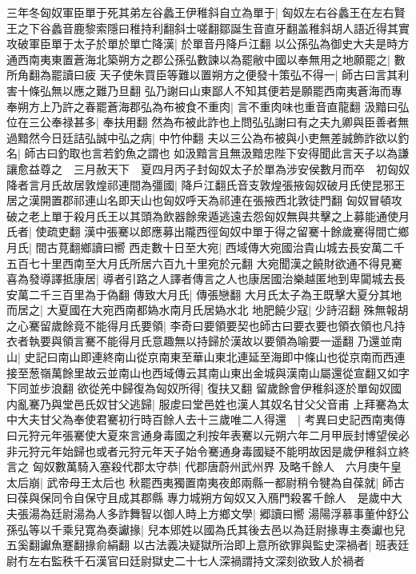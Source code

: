 三年冬匈奴軍臣單于死其弟左谷蠡王伊稚斜自立為單于|{
	匈奴左右谷蠡王在左右賢王之下谷蠡音鹿黎索隱曰稚持利翻斜士嗟翻鄒誕生音直牙翻盖稚斜胡人語近得其實}
攻破軍臣單于太子於單於單亡降漢|{
	於單音丹降戶江翻}
以公孫弘為御史大夫是時方通西南夷東置蒼海北築朔方之郡公孫弘數諫以為罷敝中國以奉無用之地願罷之|{
	數所角翻為罷讀曰疲}
天子使朱買臣等難以置朔方之便發十策弘不得一|{
	師古曰言其利害十條弘無以應之難乃旦翻}
弘乃謝曰山東鄙人不知其便若是願罷西南夷蒼海而專奉朔方上乃許之春罷蒼海郡弘為布被食不重肉|{
	言不重肉味也重音直龍翻}
汲黯曰弘位在三公奉禄甚多|{
	奉扶用翻}
然為布被此詐也上問弘弘謝曰有之夫九卿與臣善者無過黯然今日廷詰弘誠中弘之病|{
	中竹仲翻}
夫以三公為布被與小吏無差誠飾詐欲以釣名|{
	師古曰釣取也言若釣魚之謂也}
如汲黯言且無汲黯忠陛下安得聞此言天子以為謙讓愈益尊之　三月赦天下　夏四月丙子封匈奴太子於單為涉安侯數月而卒　初匈奴降者言月氏故居敦煌祁連間為彊國|{
	降戶江翻氏音支敦煌張掖匈奴破月氏使昆邪王居之漢開置郡祁連山名即天山也匈奴呼天為祁連在張掖西北敦徒門翻}
匈奴冒頓攻破之老上單于殺月氏王以其頭為飲器餘衆遁逃遠去怨匈奴無與共擊之上募能通使月氏者|{
	使疏吏翻}
漢中張騫以郎應募出隴西徑匈奴中單于得之留騫十餘歲騫得間亡鄉月氏|{
	間古莧翻鄉讀曰嚮}
西走數十日至大宛|{
	西域傳大宛國治貴山城去長安萬二千五百七十里西南至大月氏所居六百九十里宛於元翻}
大宛聞漢之饒財欲通不得見騫喜為發導譯抵康居|{
	導者引路之人譯者傳言之人也康居國治樂越匿地到卑闐城去長安萬二千三百里為于偽翻}
傳致大月氏|{
	傳張戀翻}
大月氏太子為王既擊大夏分其地而居之|{
	大夏國在大宛西南都媯水南月氏居媯水北}
地肥饒少寇|{
	少詩沼翻}
殊無報胡之心騫留歲餘竟不能得月氏要領|{
	李奇曰要領要契也師古曰要衣要也領衣領也凡持衣者執要與領言騫不能得月氏意趣無以持歸於漢故以要領為喻要一遥翻}
乃還並南山|{
	史記曰南山即連終南山從京南東至華山東北連延至海即中條山也從京南而西連接至葱嶺萬餘里故云並南山也西域傳云其南山東出金城與漢南山屬還從宣翻又如字下同並步浪翻}
欲從羌中歸復為匈奴所得|{
	復扶又翻}
留歲餘會伊稚斜逐於單匈奴國内亂騫乃與堂邑氏奴甘父逃歸|{
	服䖍曰堂邑姓也漢人其奴名甘父父音甫}
上拜騫為太中大夫甘父為奉使君騫初行時百餘人去十三歲唯二人得還　|{
	考異曰史記西南夷傳曰元狩元年張騫使大夏來言通身毒國之利按年表騫以元朔六年二月甲辰封博望侯必非元狩元年始歸也或者元狩元年天子始令騫通身毒國疑不能明故因是歲伊稚斜立終言之}
匈奴數萬騎入塞殺代郡太守恭|{
	代郡唐蔚州武州界}
及略千餘人　六月庚午皇太后崩|{
	武帝母王太后也}
秋罷西夷獨置南夷夜郎兩縣一都尉稍令犍為自葆就|{
	師古曰葆與保同令自保守且成其郡縣}
專力城朔方匈奴又入鴈門殺畧千餘人　是歲中大夫張湯為廷尉湯為人多詐舞智以御人時上方鄉文學|{
	郷讀曰嚮}
湯陽浮慕事董仲舒公孫弘等以千乘兒寛為奏讞掾|{
	兒本郳姓以國為氏其後去邑以為廷尉掾專主奏讞也兒五奚翻讞魚蹇翻掾俞絹翻}
以古法義决疑獄所治即上意所欲罪與監史深禍者|{
	班表廷尉冇左右監秩千石漢官曰廷尉獄史二十七人深禍謂持文深刻欲致人於禍者}
